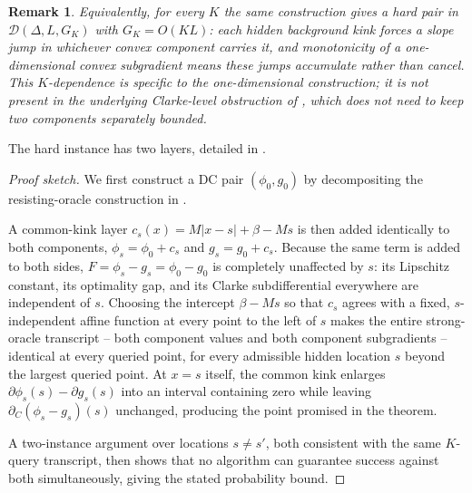 \documentclass[english]{article}
\newtheorem{remark}{Remark}[section]
\begin{document}
\begin{remark}
\label{rmk:GK-tradeoff}
Equivalently, for every $K$ the same construction gives a hard pair in $\mathcal D(\Delta,L,G_K)$ with $G_K=O(KL)$: each hidden background kink forces a slope jump in whichever convex component carries it, and monotonicity of a one-dimensional convex subgradient means these jumps accumulate rather than cancel. This $K$-dependence is specific to the one-dimensional construction; it is not present in the underlying Clarke-level obstruction of \citet{Zhang-2020-Complexity}, which does not need to keep two components separately bounded. 
\end{remark}
The hard instance has two layers, detailed in
.
\begin{proof}[Proof sketch]
We first construct a DC pair $(\phi_0,g_0)$ by decompositing the 
resisting-oracle construction in \citet{Zhang-2020-Complexity}.

A common-kink layer $c_s(x)=M|x-s|+\beta-Ms$ is then added identically to
both components, $\phi_s=\phi_0+c_s$ and $g_s=g_0+c_s$. Because the same
term is added to both sides, $F=\phi_s-g_s=\phi_0-g_0$ is completely
unaffected by $s$: its Lipschitz constant, its optimality gap, and its
Clarke subdifferential everywhere are independent of $s$. Choosing the
intercept $\beta-Ms$ so that $c_s$ agrees with a fixed, $s$-independent
affine function at every point to the left of $s$ makes the entire
strong-oracle transcript -- both component values and both component
subgradients -- identical at every queried point, for every admissible
hidden location $s$ beyond the largest queried point. At $x=s$ itself,
the common kink enlarges $\partial\phi_s(s)-\partial g_s(s)$ into an
interval containing zero while leaving $\partial_C(\phi_s-g_s)(s)$
unchanged, producing the point promised in the theorem.

A two-instance argument over locations $s\neq s'$, both consistent with
the same $K$-query transcript, then shows that no algorithm can
guarantee success against both simultaneously, giving the stated
probability bound.
\end{proof}
\end{document}
